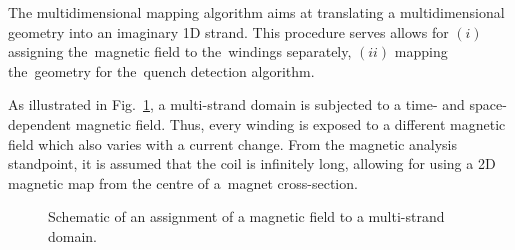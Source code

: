 
The multidimensional mapping algorithm aims at translating a multidimensional geometry into an imaginary 1D strand. This procedure serves allows for $(i)$ assigning the~magnetic field to the~windings separately, $(ii)$ mapping the~geometry for the~quench detection algorithm. 

As illustrated in Fig.~\ref{fig: 3d_coil_illustation_with_2d_b_field}, a multi-strand domain is subjected to a time- and space-dependent magnetic field. Thus, every winding is exposed to a different magnetic field which also varies with a current change. From the magnetic analysis standpoint, it is assumed that the coil is infinitely long, allowing for using a 2D magnetic map from the centre of a~magnet cross-section.

\begin{figure}[H]
    \centering
    \caption{Schematic of an assignment of a magnetic field to a multi-strand domain.}
    \label{fig: 3d_coil_illustation_with_2d_b_field}
\end{figure}

